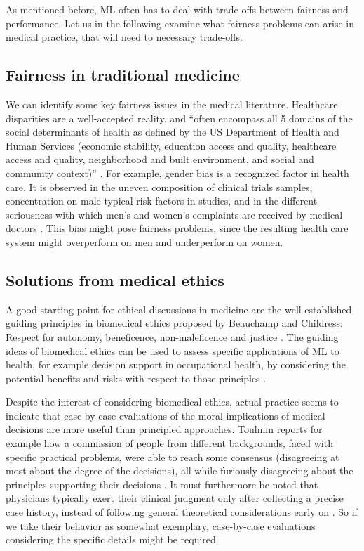     As mentioned before, ML often has to deal with trade-offs between fairness and performance.
    Let us in the following examine what fairness problems can arise in medical practice, that will need to necessary trade-offs.

\subsection{Fairness in traditional medicine}
    We can identify some key fairness issues in the medical literature.
    Healthcare disparities are a well-accepted reality, and ``often encompass all 5 domains of the social determinants of health as defined by the US Department of Health and Human Services (economic stability, education access and quality, healthcare access and quality, neighborhood and built environment, and social and community context)'' \cite[p.~2]{Chen2021}.
    For example, gender bias is a recognized factor in health care.
    It is observed \eg in the uneven composition of clinical trials samples, concentration on male-typical risk factors in studies, and in the different seriousness with which men's and women's complaints are received by medical doctors \cite{Ruiz1997}.
    This bias might pose fairness problems, since the resulting health care system might overperform on men and underperform on women.

\subsection{Solutions from medical ethics}
    A good starting point for ethical discussions in medicine are the well-established guiding principles in biomedical ethics proposed by Beauchamp and Childress: Respect for autonomy, beneficence, non-maleficence and justice \cite{Dijkstra2020, Morley2020, Rajkomar2018}.
    The guiding ideas of biomedical ethics can be used to assess specific applications of ML to health, for example decision support in occupational health, by considering the potential benefits and risks with respect to those principles \cite{Dijkstra2020}.

    Despite the interest of considering biomedical ethics, actual practice seems to indicate that case-by-case evaluations of the moral implications of medical decisions are more useful than principled approaches.
    Toulmin\cite{Toulmin1982} reports for example how a commission of people from different backgrounds, faced with specific practical problems, were able to reach some consensus (disagreeing at most about the degree of the decisions), all while furiously disagreeing about the principles supporting their decisions \cite{Toulmin1982}.
    It must furthermore be noted that physicians typically exert their clinical judgment only after collecting a precise case history, instead of following general theoretical considerations early on \cite{Toulmin1982}.
    So if we take their behavior as somewhat exemplary, case-by-case evaluations considering the specific details might be required.
